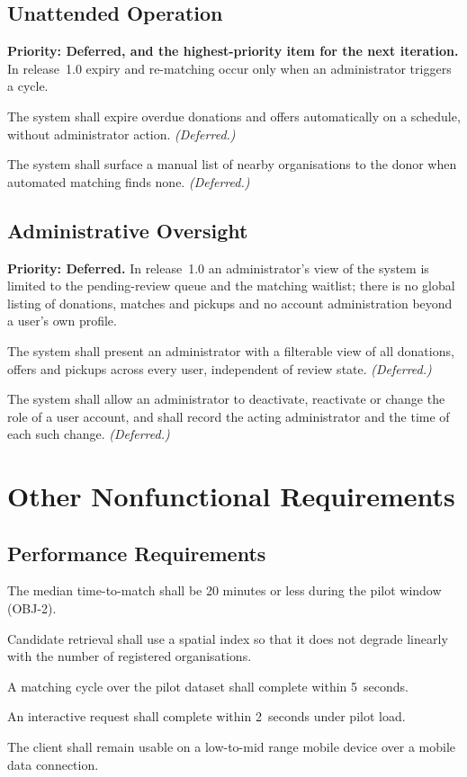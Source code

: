 \documentclass[11pt,a4paper]{article}
\newcommand{\req}[2]{\item[\textbf{#1}] #2}
\begin{document}
\subsection{Unattended Operation}
\textbf{Priority: Deferred, and the highest-priority item for the next
iteration.} In release~1.0 expiry and re-matching occur only when an
administrator triggers a cycle.

\begin{description}[leftmargin=1.6cm,style=nextline,font=\normalfont\bfseries]
  \req{FR-52}{The system shall expire overdue donations and offers automatically
    on a schedule, without administrator action. \textit{(Deferred.)}}
  \req{FR-53}{The system shall surface a manual list of nearby organisations to
    the donor when automated matching finds none. \textit{(Deferred.)}}
\end{description}

\subsection{Administrative Oversight}
\textbf{Priority: Deferred.} In release~1.0 an administrator's view of the
system is limited to the pending-review queue and the matching waitlist; there
is no global listing of donations, matches and pickups and no account
administration beyond a user's own profile.

\begin{description}[leftmargin=1.6cm,style=nextline,font=\normalfont\bfseries]
  \req{FR-54}{The system shall present an administrator with a filterable view
    of all donations, offers and pickups across every user, independent of
    review state. \textit{(Deferred.)}}
  \req{FR-55}{The system shall allow an administrator to deactivate, reactivate
    or change the role of a user account, and shall record the acting
    administrator and the time of each such change. \textit{(Deferred.)}}
\end{description}

\section{Other Nonfunctional Requirements}

\subsection{Performance Requirements}
\begin{description}[leftmargin=1.9cm,style=nextline,font=\normalfont\bfseries]
  \req{NFR-1}{The median time-to-match shall be 20 minutes or less during the
    pilot window (OBJ-2).}
  \req{NFR-2}{Candidate retrieval shall use a spatial index so that it does not
    degrade linearly with the number of registered organisations.}
  \req{NFR-3}{A matching cycle over the pilot dataset shall complete within
    5~seconds.}
  \req{NFR-4}{An interactive request shall complete within 2~seconds under pilot
    load.}
  \req{NFR-5}{The client shall remain usable on a low-to-mid range mobile device
    over a mobile data connection.}
\end{description}
\end{document}
